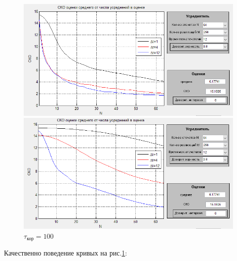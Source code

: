\begin{figure}[H]
    \begin{minipage}{0.45\linewidth}
        \centering
        \includegraphics[width=0.85\linewidth]{fig/fig31}
        \caption*{$\tau_\text{кор} = 10$}
    \end{minipage}
    \begin{minipage}{.45\linewidth}
        \centering
        \includegraphics[width=0.85\linewidth]{fig/fig32}
        \caption*{$\tau_\text{кор} = 100$}
    \end{minipage}
    \label{fig:3}
\end{figure}
Качественно поведение кривых на рис.\ref{fig:3}:

